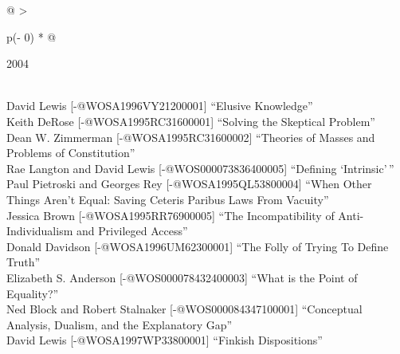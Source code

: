 \documentclass[
  10pt,
  letterpaper,
  DIV=11,
  numbers=noendperiod,
  twoside]{scrartcl}
\begin{document}
\begin{longtable}[]{@{}
  >{\raggedright\arraybackslash}p{(\columnwidth - 0\tabcolsep) * }@{}}

\caption{\label{tbl-top-ten-1995}Most cited articles published less than
ten years ago as of 2004.}

\tabularnewline

\toprule\noalign{}
\begin{minipage}[b]{\linewidth}\raggedright
2004
\end{minipage} \\
\midrule\noalign{}
\endhead
\bottomrule\noalign{}
\endlastfoot
David Lewis {[}-@WOSA1996VY21200001{]} ``Elusive Knowledge'' \\
Keith DeRose {[}-@WOSA1995RC31600001{]} ``Solving the Skeptical
Problem'' \\
Dean W. Zimmerman {[}-@WOSA1995RC31600002{]} ``Theories of Masses and
Problems of Constitution'' \\
Rae Langton and David Lewis {[}-@WOS000073836400005{]} ``Defining
`Intrinsic'\,'' \\
Paul Pietroski and Georges Rey {[}-@WOSA1995QL53800004{]} ``When Other
Things Aren't Equal: Saving Ceteris Paribus Laws From Vacuity'' \\
Jessica Brown {[}-@WOSA1995RR76900005{]} ``The Incompatibility of
Anti-Individualism and Privileged Access'' \\
Donald Davidson {[}-@WOSA1996UM62300001{]} ``The Folly of Trying To
Define Truth'' \\
Elizabeth S. Anderson {[}-@WOS000078432400003{]} ``What is the Point of
Equality?'' \\
Ned Block and Robert Stalnaker {[}-@WOS000084347100001{]} ``Conceptual
Analysis, Dualism, and the Explanatory Gap'' \\
David Lewis {[}-@WOSA1997WP33800001{]} ``Finkish Dispositions'' \\

\end{longtable}
\end{document}
